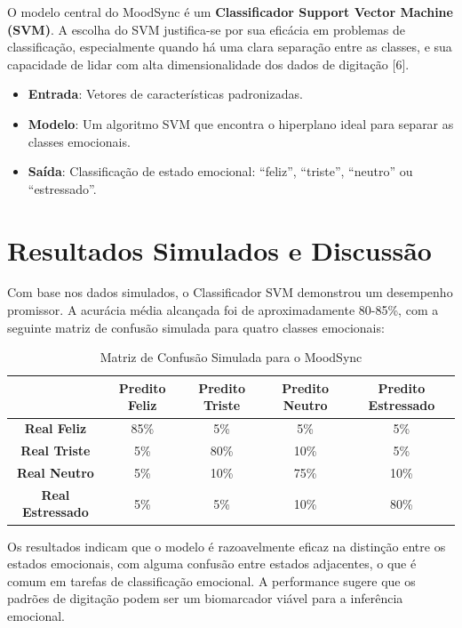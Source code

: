 \documentclass{article}
\begin{document}
O modelo central do MoodSync é um \textbf{Classificador Support Vector Machine (SVM)}. A escolha do SVM justifica-se por sua eficácia em problemas de classificação, especialmente quando há uma clara separação entre as classes, e sua capacidade de lidar com alta dimensionalidade dos dados de digitação [6].

\begin{itemize}
    \item \textbf{Entrada}: Vetores de características padronizadas.
    \item \textbf{Modelo}: Um algoritmo SVM que encontra o hiperplano ideal para separar as classes emocionais.
    \item \textbf{Saída}: Classificação de estado emocional: ``feliz'', ``triste'', ``neutro'' ou ``estressado''.
\end{itemize}

\section{Resultados Simulados e Discussão}

Com base nos dados simulados, o Classificador SVM demonstrou um desempenho promissor. A acurácia média alcançada foi de aproximadamente 80-85\%, com a seguinte matriz de confusão simulada para quatro classes emocionais:

\begin{table}[h!]
    \centering
    \caption{Matriz de Confusão Simulada para o MoodSync}
    \begin{tabular}{|c|c|c|c|c|}
        \hline
        & \textbf{Predito Feliz} & \textbf{Predito Triste} & \textbf{Predito Neutro} & \textbf{Predito Estressado} \\
        \hline
        \textbf{Real Feliz} & 85\% & 5\% & 5\% & 5\% \\
        \textbf{Real Triste} & 5\% & 80\% & 10\% & 5\% \\
        \textbf{Real Neutro} & 5\% & 10\% & 75\% & 10\% \\
        \textbf{Real Estressado} & 5\% & 5\% & 10\% & 80\% \\
        \hline
    \end{tabular}
    \label{tab:confusion_matrix_moodsync}
\end{table}

Os resultados indicam que o modelo é razoavelmente eficaz na distinção entre os estados emocionais, com alguma confusão entre estados adjacentes, o que é comum em tarefas de classificação emocional. A performance sugere que os padrões de digitação podem ser um biomarcador viável para a inferência emocional.
\end{document}
